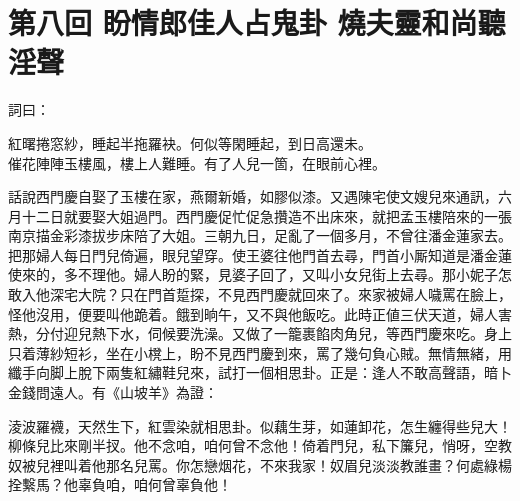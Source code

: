 
\chapter*{第八回 盼情郎佳人占鬼卦 燒夫靈和尚聽淫聲}


詞曰：

\begin{myquote} 
紅曙捲窓紗，睡起半拖羅袂。何似等閑睡起，到日高還未。\\催花陣陣玉樓風，樓上人難睡。有了人兒一箇，在眼前心裡。
\end{myquote} 

話說西門慶自娶了玉樓在家，燕爾新婚，如膠似漆。又遇陳宅使文嫂兒來通訊，六月十二日就要娶大姐過門。西門慶促忙促急攢造不出床來，就把孟玉樓陪來的一張南京描金彩漆拔步床陪了大姐。三朝九日，足亂了一個多月，不曾往潘金蓮家去。把那婦人每日門兒倚遍，眼兒望穿。使王婆往他門首去尋，門首小厮知道是潘金蓮使來的，多不理他。婦人盼的緊，見婆子回了，又叫小女兒街上去尋。那小妮子怎敢入他深宅大院？只在門首踅探，不見西門慶就回來了。來家被婦人噦罵在臉上，怪他沒用，便要叫他跪着。餓到晌午，又不與他飯吃。此時正値三伏天道，婦人害熱，分付迎兒熱下水，伺候要洗澡。又做了一籠裹餡肉角兒，等西門慶來吃。身上只着薄紗短衫，坐在小櫈上，盼不見西門慶到來，罵了幾句負心賊。無情無緒，用纖手向脚上脫下兩隻紅繡鞋兒來，試打一個相思卦。正是：逢人不敢高聲語，暗卜金錢問遠人。有《山坡羊》為證：

\begin{myquote} 
淩波羅襪，天然生下，紅雲染就相思卦。似藕生芽，如蓮卸花，怎生纏得些兒大！柳條兒比來剛半扠。他不念咱，咱何曾不念他！倚着門兒，私下簾兒，悄呀，空教奴被兒裡叫着他那名兒罵。你怎戀烟花，不來我家！奴眉兒淡淡教誰畫？何處綠楊拴繫馬？他辜負咱，咱何曾辜負他！
\end{myquote} 

